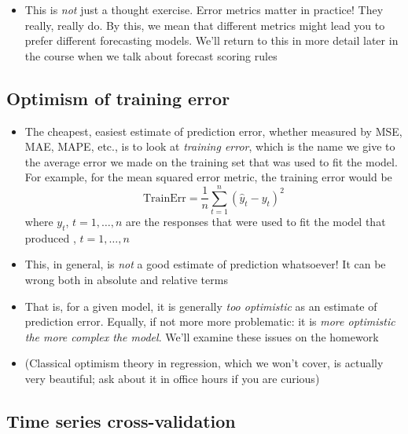 \documentclass{article}
\begin{document}
\begin{itemize}
\item This is \emph{not} just a thought exercise. Error metrics matter in
  practice! They really, really do. By this, we mean that different metrics
  might lead you to prefer different forecasting models. We'll return to this in
  more detail later in the course when we talk about forecast scoring rules
\end{itemize}

\subsection{Optimism of training error}

\def\TrainErr{\mathrm{TrainErr}}

\begin{itemize}
\item The cheapest, easiest estimate of prediction error, whether measured by
  MSE, MAE, MAPE, etc., is to look at \emph{training error}, which is the name
  we give to the average error we made on the training set that was used to fit
  the model. For example, for the mean squared error metric, the training error
  would be
  \[
  \TrainErr = \frac{1}{n} \sum_{t=1}^n (\hat{y}_t - y_t)^2
  \]
  where $y_t$, $t = 1,\dots,n$ are the responses that were used to fit the model
  that produced , $t = 1,\dots,n$

\item This, in general, is \emph{not} a good estimate of prediction
  whatsoever! It can be wrong both in absolute and relative terms

\item That is, for a given model, it is generally \emph{too optimistic} as an
  estimate of prediction error. Equally, if not more more problematic: it is
  \emph{more optimistic the more complex the model}. We'll examine these issues
  on the homework 

\item (Classical optimism theory in regression, which we won't cover, is
  actually very beautiful; ask about it in office hours if you are curious) 
\end{itemize}

\subsection{Time series cross-validation}

\def\SplitErr{\mathrm{SplitErr}}
\def\CVErr{\mathrm{CVErr}}
\end{document}
